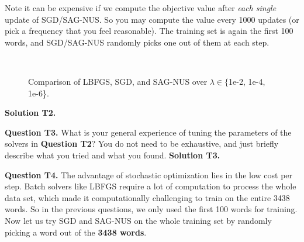 \documentclass[11pt]{report}
\begin{document}
{Note it can be expensive if we compute the objective value after \emph{each single} update of SGD/SAG-NUS.
So you may compute the value every 1000 updates (or pick a frequency that you feel reasonable).
The training set is again the first 100 words,
and SGD/SAG-NUS randomly picks one out of them at each step.


\begin{figure}[t]
\centering
{}
~~
~~
\caption{Comparison of LBFGS, SGD, and SAG-NUS over $\lambda \in \{${\sf 1e-2, 1e-4, 1e-6}\}.}
\label{fig:compare_sgd}
\end{figure}

{\bf Solution T2.}

{\bf Question T3.}
What is your general experience of tuning the parameters of the solvers in {\bf Question T2}?
You do not need to be exhaustive, and just briefly describe what you tried and what you found.
{\bf Solution T3.}

{\bf Question T4.}
The advantage of stochastic optimization lies in the low cost per step.
Batch solvers like LBFGS require a lot of computation to process the whole data set,
which made it computationally challenging to train on the entire 3438 words.
So in the previous questions, we only used the first 100 words for training.
Now let us try SGD and SAG-NUS on the whole training set by randomly picking a word out of the {\bf 3438 words}.

}
\end{document}
